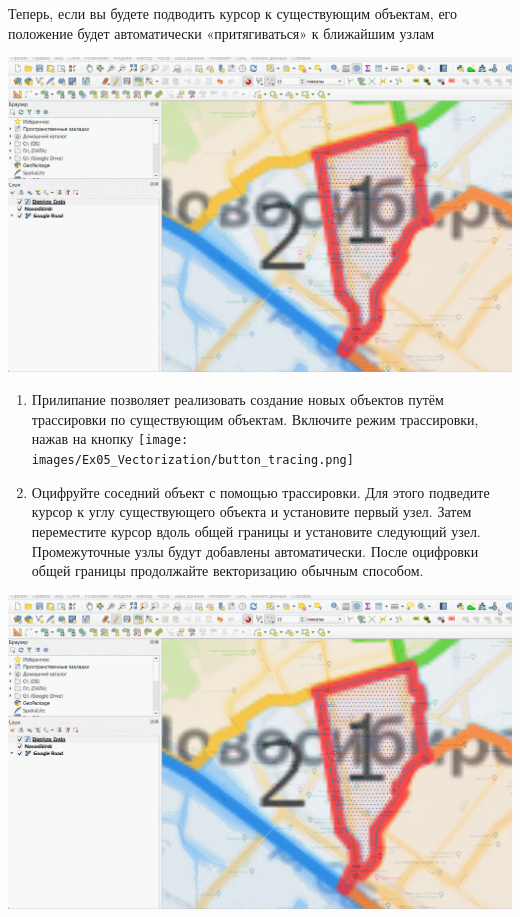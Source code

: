 \documentclass[
  12pt,
]{book}
\begin{document}
Теперь, если вы будете подводить курсор к существующим объектам, его положение будет автоматически «притягиваться» к ближайшим узлам

\includegraphics{images/Ex05_Vectorization/snapping_in_action.gif}

\begin{enumerate}
\def\labelenumi{\arabic{enumi}.}
\setcounter{enumi}{10}
\item
  Прилипание позволяет реализовать создание новых объектов путём трассировки по существующим объектам. Включите режим трассировки, нажав на кнопку \texttt{[image: images/Ex05\_Vectorization/button\_tracing.png]}
\item
  Оцифруйте соседний объект с помощью трассировки. Для этого подведите курсор к углу существующего объекта и установите первый узел. Затем переместите курсор вдоль общей границы и установите следующий узел. Промежуточные узлы будут добавлены автоматически. После оцифровки общей границы продолжайте векторизацию обычным способом.
\end{enumerate}

\includegraphics{images/Ex05_Vectorization/tracing_vectorization.gif}
\end{document}
